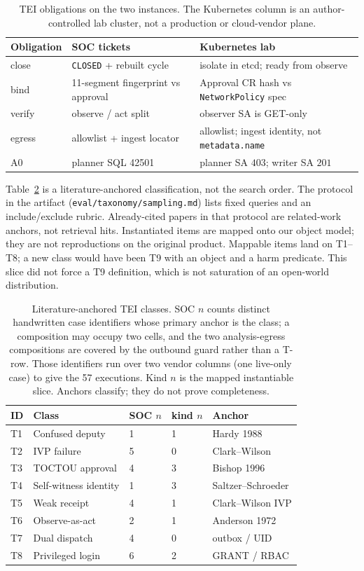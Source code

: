 \documentclass[acmsmall,manuscript,review,anonymous]{acmart}
\renewcommand{\_}{\discretionary{\textunderscore}{}{\textunderscore}}
\begin{document}
\begin{table}[t]
\centering
\small
\caption{TEI obligations on the two instances. The Kubernetes column is
an author-controlled lab cluster, not a production or cloud-vendor
plane.}
\label{tab:tei-map}
\begin{tabular}{@{}lll@{}}
\hline
Obligation & SOC tickets & Kubernetes lab \\
\hline
close & \texttt{CLOSED} + rebuilt cycle & isolate in etcd; ready from observe \\
bind & 11-segment fingerprint vs approval & Approval CR hash vs \texttt{NetworkPolicy} spec \\
verify & observe / act split & observer SA is GET-only \\
egress & allowlist + ingest locator & allowlist; ingest identity, not \texttt{metadata.name} \\
A0 & planner {SQL} 42501 & planner SA $403$; writer SA $201$ \\
\hline
\end{tabular}
\end{table}

Table~\ref{tab:taxonomy} is a literature-anchored classification, not the
search order. The protocol in the artifact
(\texttt{eval/taxonomy/}\allowbreak\texttt{sampling.md}) lists fixed queries and an
include/exclude rubric. Already-cited papers in that protocol are
related-work anchors, not retrieval hits. Instantiated items are
mapped onto our object model; they are not reproductions on the original
product. Mappable items land on T1--T8; a new class would have
been T9 with an object and a harm predicate. This slice did not force a
T9 definition, which is not saturation of an open-world distribution.

\begin{table}[t]
\centering
\scriptsize
\caption{Literature-anchored TEI classes. SOC $n$ counts distinct handwritten
case identifiers whose primary anchor is the class; a composition may occupy
two cells, and the two analysis-egress compositions are covered by the
outbound guard rather than a T-row. Those identifiers run over two vendor
columns (one live-only case) to give the 57 executions. Kind $n$ is the mapped
instantiable slice. Anchors classify; they do not prove completeness.}
\label{tab:taxonomy}
\begin{tabular}{@{}lllll@{}}
\hline
ID & Class & SOC $n$ & kind $n$ & Anchor \\
\hline
T1 & Confused deputy & 1 & 1 & Hardy 1988 \\
T2 & IVP failure & 5 & 0 & Clark--Wilson \\
T3 & TOCTOU approval & 4 & 3 & Bishop 1996 \\
T4 & Self-witness identity & 1 & 3 & Saltzer--Schroeder \\
T5 & Weak receipt & 4 & 1 & Clark--Wilson IVP \\
T6 & Observe-as-act & 2 & 1 & Anderson 1972 \\
T7 & Dual dispatch & 4 & 0 & outbox / UID \\
T8 & Privileged login & 6 & 2 & GRANT / RBAC \\
\hline
\end{tabular}
\end{table}
\end{document}
